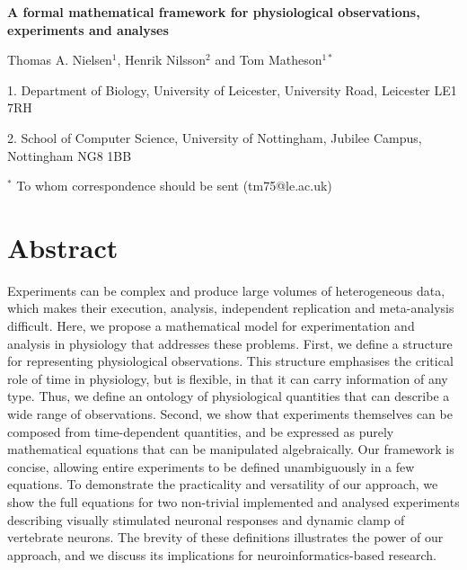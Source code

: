 \documentclass[11pt]{article}
\author{Thomas A. Nielsen, Henrik Nilsson and Tom Matheson}
\begin{document}
\begin{titlepage}

\vspace{50 mm}
\begin{center}{\LARGE {\bf A formal mathematical framework for
  physiological observations, experiments and analyses}}
\end{center}
\vspace{50 mm}

\begin{center}{\large Thomas A. Nielsen$^{1}$, Henrik Nilsson$^2$ and Tom Matheson$^{1*}$}
\end{center}
\vspace{50 mm}

\begin{flushleft}
1. Department of Biology, University of Leicester, University Road, Leicester LE1 7RH

2. School of Computer Science, University of Nottingham, Jubilee Campus, Nottingham NG8 1BB
\vspace{50 mm}

$^*$ To whom correspondence should be sent (tm75@le.ac.uk)

\end{flushleft}

\end{titlepage}

\section*{Abstract}

Experiments can be complex and produce large volumes of heterogeneous
data, which makes their execution, analysis, independent replication
and meta-analysis difficult. Here, we propose a mathematical model for
experimentation and analysis in physiology that addresses these
problems. First, we define a structure for representing physiological
observations. This structure emphasises the critical role of time in
physiology, but is flexible, in that it can carry information of any
type. Thus, we define an ontology of physiological quantities that can
describe a wide range of observations. Second, we show that
experiments themselves can be composed from time-dependent quantities,
and be expressed as purely mathematical equations that can be
manipulated algebraically. Our framework is concise, allowing entire
experiments to be defined unambiguously in a few equations. To
demonstrate the practicality and versatility of our approach, we show
the full equations for two non-trivial implemented and analysed
experiments describing visually stimulated neuronal responses and
dynamic clamp of vertebrate neurons. The brevity of these definitions
illustrates the power of our approach, and we discuss its implications
for neuroinformatics-based research.
\end{document}
